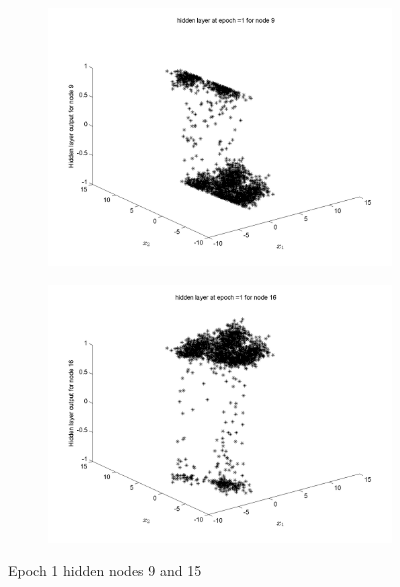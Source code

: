\documentclass{article}
\begin{document}
\begin{figure}
\begin{subfigure}{.5\textwidth}
  \centering
  \includegraphics[width=.8\linewidth]{Classification/overlapping/h1_9}
 
\end{subfigure}%
\begin{subfigure}{.5\textwidth}
  \centering
  \includegraphics[width=.8\linewidth]{Classification/overlapping/h1_15}
  \end{subfigure}
\caption{Epoch 1 hidden nodes 9 and 15}
\end{figure}
\end{document}
